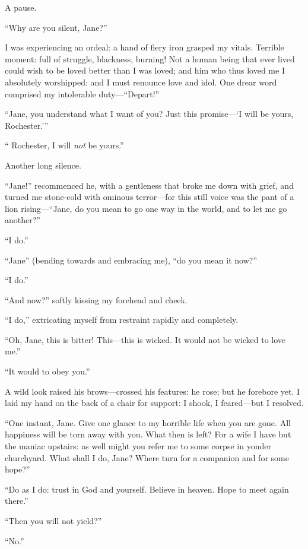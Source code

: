 A pause.

\enquote{Why are you silent, Jane?}

I was experiencing an ordeal: a hand of fiery iron grasped my vitals.
Terrible moment: full of struggle, blackness, burning! Not a human
being that ever lived could wish to be loved better than I was loved;
and him who thus loved me I absolutely worshipped: and I must renounce
love and idol. One drear word comprised my intolerable
duty---\enquote{Depart!}

\enquote{Jane, you understand what I want of you? Just this
	promise---\enquote{I will be yours, \Mr{} Rochester.}}

\enquote{\Mr{} Rochester, I will \emph{not} be yours.}

Another long silence.

\enquote{Jane!} recommenced he, with a gentleness that broke me down
with grief, and turned me stone-cold with ominous terror---for this
still voice was the pant of a lion rising---\enquote{Jane, do you mean
	to go one way in the world, and to let me go another?}

\enquote{I do.}

\enquote{Jane} (bending towards and embracing me), \enquote{do you mean
	it now?}

\enquote{I do.}

\enquote{And now?} softly kissing my forehead and cheek.

\enquote{I do,} extricating myself from restraint rapidly and
completely.

\enquote{Oh, Jane, this is bitter! This---this is wicked. It would not
	be wicked to love me.}

\enquote{It would to obey you.}

A wild look raised his brows---crossed his features: he rose; but he
forebore yet. I laid my hand on the back of a chair for support: I
shook, I feared---but I resolved.

\enquote{One instant, Jane. Give one glance to my horrible life when
	you are gone. All happiness will be torn away with you. What then is
	left? For a wife I have but the maniac upstairs: as well might you
	refer me to some corpse in yonder churchyard. What shall I do, Jane?
	Where turn for a companion and for some hope?}

\enquote{Do as I do: trust in God and yourself. Believe in heaven.
	Hope to meet again there.}

\enquote{Then you will not yield?}

\enquote{No.}

